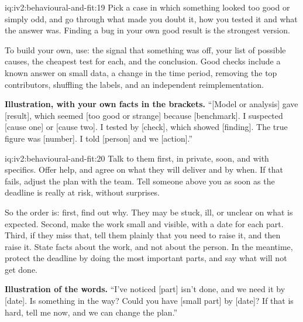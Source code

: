 \begin{solution}{iq:iv2:behavioural-and-fit:19}
Pick a case in which something looked too good or simply odd, and go through what made you doubt it, how you tested it and what the answer was. Finding a bug in your own good result is the strongest version.

To build your own, use: the signal that something was off, your list of possible causes, the cheapest test for each, and the conclusion. Good checks include a known answer on small data, a change in the time period, removing the top contributors, shuffling the labels, and an independent reimplementation.

\textbf{Illustration, with your own facts in the brackets.} ``[Model or analysis] gave [result], which seemed [too good or strange] because [benchmark]. I suspected [cause one] or [cause two]. I tested by [check], which showed [finding]. The true figure was [number]. I told [person] and we [action].''

\end{solution}

\begin{solution}{iq:iv2:behavioural-and-fit:20}
Talk to them first, in private, soon, and with specifics. Offer help, and agree on what they will deliver and by when. If that fails, adjust the plan with the team. Tell someone above you as soon as the deadline is really at risk, without surprises.

So the order is: first, find out why. They may be stuck, ill, or unclear on what is expected. Second, make the work small and visible, with a date for each part. Third, if they miss that, tell them plainly that you need to raise it, and then raise it. State facts about the work, and not about the person. In the meantime, protect the deadline by doing the most important parts, and say what will not get done.

\textbf{Illustration of the words.} ``I've noticed [part] isn't done, and we need it by [date]. Is something in the way? Could you have [small part] by [date]? If that is hard, tell me now, and we can change the plan.''

\end{solution}


